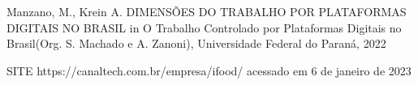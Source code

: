 \documentclass[
12pt,		%
openright,	%
twoside,  %
a4paper,			%
chapter=TITLE,		%
english,			%
french,				%
spanish,			%
brazil				%
]{USPSC-classe/USPSC}
\begin{document}
\begin{flushleft}
\begin{flushleft}
\begin{flushleft}
\begin{flushleft}
\begin{flushleft}
\begin{flushleft}
\begin{flushleft}
\begin{flushleft}
 Manzano, M., Krein A. DIMENS\~OES DO TRABALHO POR PLATAFORMAS DIGITAIS NO BRASIL in \textquotedbl O Trabalho Controlado por Plataformas Digitais no Brasil\textquotedbl  (Org. S. Machado e A. Zanoni), Universidade Federal do Paran\'a, 2022
\end{flushleft}


\end{flushleft}


\end{flushleft}


\end{flushleft}


\end{flushleft}


\end{flushleft}


\end{flushleft}


\end{flushleft}


\begin{flushleft}
\begin{flushleft}
\begin{flushleft}
\begin{flushleft}
\begin{flushleft}
\begin{flushleft}
\begin{flushleft}
\begin{flushleft}
[CANALTECH, 2022] SITE https://canaltech.com.br/empresa/ifood/ acessado em 6 de janeiro de 2023
\end{flushleft}


\end{flushleft}


\end{flushleft}


\end{flushleft}


\end{flushleft}


\end{flushleft}


\end{flushleft}


\end{flushleft}
\end{document}
